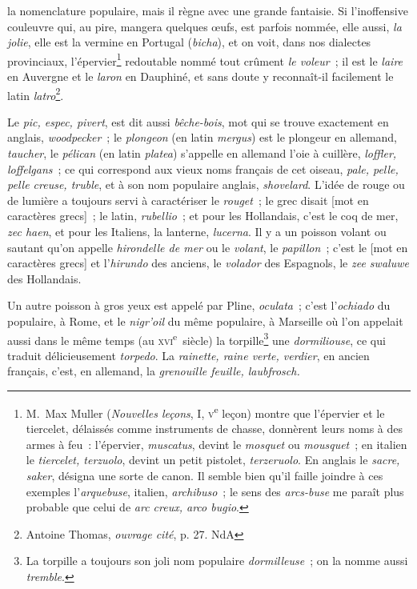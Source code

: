 \documentclass[french,twoside]{book} %
\def\mednobreak{\ifdim\lastskip<\medskipamount
  \removelastskip\nopagebreak\medskip\fi}
\newcommand{\labelblock}[1]{\medbreak{\noindent\color{rubric}\bfseries #1}\par\mednobreak}
\begin{document}
la nomenclature populaire, mais il règne avec une grande fantaisie. Si l’inoffensive couleuvre qui, au pire, mangera quelques œufs, est parfois nommée, elle aussi, {\itshape la jolie}, elle est la vermine en Portugal ({\itshape bicha}), et on voit, dans nos dialectes provinciaux, l’épervier\footnote{M. Max Muller ({\itshape Nouvelles leçons}, I, \textsc{v}\textsuperscript{e} leçon) montre que l’épervier et le tiercelet, délaissés comme instruments de chasse, donnèrent leurs noms à des armes à feu : l’épervier, {\itshape muscatus}, devint le {\itshape mosquet} ou {\itshape mousquet} ; en italien le {\itshape tiercelet, terzuolo}, devint un petit pistolet, {\itshape terzeruolo}. En anglais le {\itshape sacre, saker}, désigna une sorte de canon. Il semble bien qu’il faille joindre à ces exemples l’{\itshape arquebuse}, italien, {\itshape archibuso} ; le sens des {\itshape arcs-buse} me paraît plus probable que celui de {\itshape arc creux, arco bugio}. } redoutable nommé tout crûment {\itshape le voleur} ; il est le {\itshape laire} en Auvergne et le {\itshape laron} en Dauphiné, et sans doute y reconnaît-il facilement le latin {\itshape latro}\footnote{ Antoine Thomas, {\itshape ouvrage cité}, p. 27. NdA}.\par

\labelblock{{\itshape Pic. Plongeon. Pélican. Rouget. Dormiliouse.}}

\noindent Le {\itshape pic, espec, pivert}, est dit aussi {\itshape bêche-bois}, mot qui se trouve exactement en anglais, {\itshape woodpecker} ; le {\itshape plongeon} (en latin {\itshape mergus}) est le plongeur en allemand, {\itshape taucher}, le {\itshape pélican} (en latin {\itshape platea}) s’appelle en allemand l’oie à cuillère, {\itshape loffler, loffelgans} ; ce qui correspond aux vieux noms français de cet oiseau, {\itshape pale, pelle, pelle creuse, truble}, et à son nom populaire anglais, {\itshape shovelard}. L’idée de rouge ou de lumière a toujours servi à caractériser le {\itshape rouget} ; le grec disait [mot en caractères grecs] ; le latin, {\itshape rubellio} ; et pour les Hollandais, c’est le coq de mer, {\itshape zec haen}, et pour les Italiens, la lanterne, {\itshape lucerna}. Il y a un poisson volant ou sautant qu’on appelle {\itshape hirondelle de mer} ou le {\itshape volant}, le {\itshape papillon} ; c’est le [mot en caractères grecs] et l’{\itshape hirundo} des anciens, le {\itshape volador} des Espagnols, le {\itshape zee swaluwe} des Hollandais.\par
Un autre poisson à gros yeux est appelé par Pline, {\itshape oculata} ; c’est l’{\itshape ochiado} du populaire, à Rome, et le {\itshape nigr’oil} du même populaire, à Marseille où l’on appelait aussi dans le même temps (au \textsc{xvi}\textsuperscript{e} siècle) la torpille\footnote{La torpille a toujours son joli nom populaire {\itshape dormilleuse} ; on la nomme aussi {\itshape tremble}.} une {\itshape dormiliouse}, ce qui traduit délicieusement {\itshape torpedo}. La {\itshape rainette, raine verte, verdier}, en ancien français, c’est, en allemand, la {\itshape grenouille feuille, laubfrosch.}\par
\end{document}
